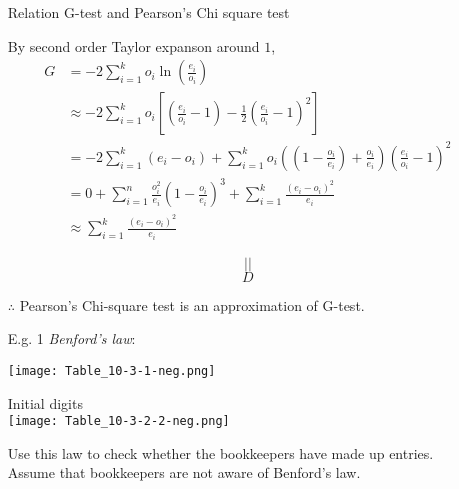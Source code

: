 \begin{frame}[fragile]

	\begin{enumerate}
		\item[Relation] G-test and Pearson's Chi square test
			\vfill
		\item[] By second order Taylor expanson around $1$,
			\begin{align*}
				G &= -2 \sum_{i=1}^k o_i \ln \left(  \frac{e_i}{o_i}\right )\\
				  &\approx
				  -2\sum_{i=1}^k o_i \left[ \left( \frac{e_i}{o_i} -1\right )-\frac12 \left(\frac{e_i}{o_i}-1 \right )^2  \right ]
				\\&=
				-2\sum_{i=1}^k (e_i-o_i) + \sum_{i=1}^k o_i\left(\left(1-\frac{o_i}{e_i}\right)+\frac{o_i}{e_i} \right)\left(\frac{e_i}{o_i}-1 \right )^2
				\\& = 0 + \sum_{i=1}^n \frac{o_i^2}{e_i} \left(1-\frac{o_i}{e_i} \right)^3 +  \sum_{i=1}^k \frac{(e_i-o_i)^2}{e_i}
				\\& \approx \sum_{i=1}^k \frac{(e_i-o_i)^2}{e_i}
			\end{align*}
		\item[]
			\vspace{-1em}
			\begin{minipage}{0.5\textwidth}
			\[||\]
			\[D\]
			\end{minipage}
			\vfill
		\item[$\therefore$] Pearson's Chi-square test is an approximation of G-test.
	\end{enumerate}
\end{frame}
\begin{frame}
\begin{enumerate}
\item[E.g. 1] {\it Benford's law}:
\begin{center}
\begin{minipage}{0.5\textwidth}
\texttt{[image: Table\_10-3-1-neg.png]}
\end{minipage}
\begin{minipage}{0.333\textwidth}
Initial digits\\
\texttt{[image: Table\_10-3-2-2-neg.png]}
\end{minipage}
\end{center}
Use this law to check whether the bookkeepers have made up entries. \\[1em]
Assume that bookkeepers are not aware of Benford's law.
\end{enumerate}
\end{frame}
